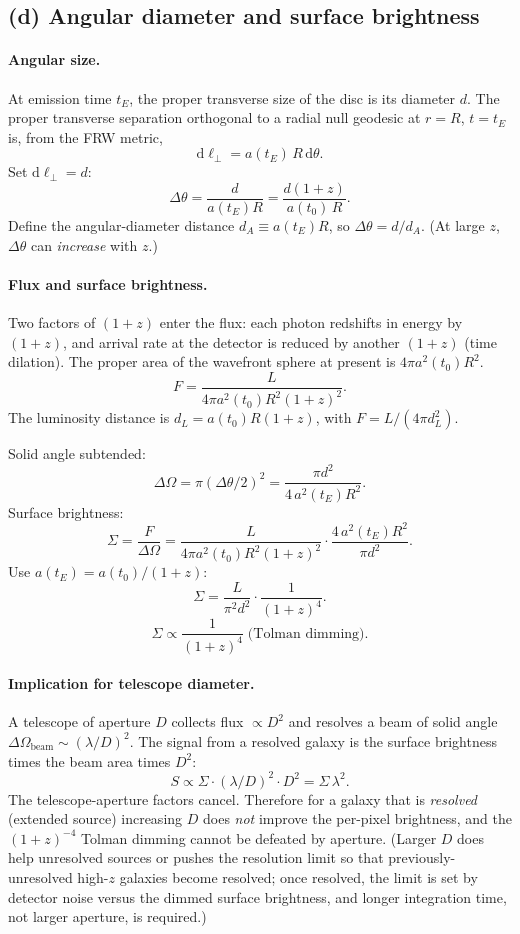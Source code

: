 \documentclass[11pt]{article}
\newcommand{\de}{\mathrm{d}}
\begin{document}
\subsection*{(d) Angular diameter and surface brightness}

\paragraph{Angular size.}
At emission time $t_E$, the proper transverse size of the disc is its diameter $d$. The proper transverse separation orthogonal to a radial null geodesic at $r=R$, $t=t_E$ is, from the FRW metric,
\[
\de\ell_\perp = a(t_E)\,R\,\de\theta.
\]
Set $\de\ell_\perp = d$:
\begin{equation}
\boxed{\;\Delta\theta = \frac{d}{a(t_E) R} = \frac{d(1+z)}{a(t_0)\,R}.\;}
\label{eq:dtheta}
\end{equation}
Define the angular-diameter distance $d_A \equiv a(t_E)R$, so $\Delta\theta = d/d_A$. (At large $z$, $\Delta\theta$ can \emph{increase} with $z$.)

\paragraph{Flux and surface brightness.}
Two factors of $(1+z)$ enter the flux: each photon redshifts in energy by $(1+z)$, and arrival rate at the detector is reduced by another $(1+z)$ (time dilation). The proper area of the wavefront sphere at present is $4\pi a^2(t_0)R^2$.
\[
F = \frac{L}{4\pi a^2(t_0)R^2(1+z)^2}.
\]
The luminosity distance is $d_L = a(t_0)R(1+z)$, with $F = L/(4\pi d_L^2)$.

Solid angle subtended:
\[
\Delta\Omega = \pi(\Delta\theta/2)^2 = \frac{\pi d^2}{4\,a^2(t_E)R^2}.
\]
Surface brightness:
\[
\Sigma = \frac{F}{\Delta\Omega} = \frac{L}{4\pi a^2(t_0)R^2(1+z)^2}\cdot\frac{4\,a^2(t_E)R^2}{\pi d^2}.
\]
Use $a(t_E) = a(t_0)/(1+z)$:
\[
\Sigma = \frac{L}{\pi^2 d^2}\cdot\frac{1}{(1+z)^4}.
\]
\begin{equation}
\boxed{\;\Sigma \propto \frac{1}{(1+z)^4}\;\text{(Tolman dimming).}\;}
\label{eq:tolman}
\end{equation}

\paragraph{Implication for telescope diameter.}
A telescope of aperture $D$ collects flux $\propto D^2$ and resolves a beam of solid angle $\Delta\Omega_\text{beam}\sim(\lambda/D)^2$. The signal from a resolved galaxy is the surface brightness times the beam area times $D^2$:
\[
S \propto \Sigma\cdot(\lambda/D)^2\cdot D^2 = \Sigma\,\lambda^2.
\]
The telescope-aperture factors cancel. Therefore for a galaxy that is \emph{resolved} (extended source) increasing $D$ does \emph{not} improve the per-pixel brightness, and the $(1+z)^{-4}$ Tolman dimming cannot be defeated by aperture. (Larger $D$ does help unresolved sources or pushes the resolution limit so that previously-unresolved high-$z$ galaxies become resolved; once resolved, the limit is set by detector noise versus the dimmed surface brightness, and longer integration time, not larger aperture, is required.)
\end{document}
